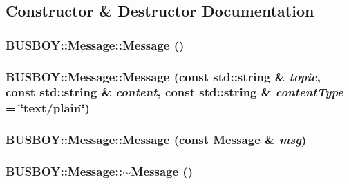 \subsection{Constructor \& Destructor Documentation}
\hypertarget{classBUSBOY_1_1Message_a3912e97d8f7dc2dcf2f2aaf2169cec41}{
\subsubsection[{Message}]{\setlength{\rightskip}{0pt plus 5cm}BUSBOY::Message::Message ()}}
\label{classBUSBOY_1_1Message_a3912e97d8f7dc2dcf2f2aaf2169cec41}
\hypertarget{classBUSBOY_1_1Message_a989563a7637c292afd0cf2442458c121}{
\subsubsection[{Message}]{\setlength{\rightskip}{0pt plus 5cm}BUSBOY::Message::Message (const std::string \& {\em topic}, \/  const std::string \& {\em content}, \/  const std::string \& {\em contentType} = {\ttfamily \char`\"{}text/plain\char`\"{}})}}
\label{classBUSBOY_1_1Message_a989563a7637c292afd0cf2442458c121}
\hypertarget{classBUSBOY_1_1Message_ac7b26859647f2bab027e1c6cee5f1864}{
\subsubsection[{Message}]{\setlength{\rightskip}{0pt plus 5cm}BUSBOY::Message::Message (const {\bf Message} \& {\em msg})}}
\label{classBUSBOY_1_1Message_ac7b26859647f2bab027e1c6cee5f1864}
\hypertarget{classBUSBOY_1_1Message_a2abcd82dbfb9d51bdd7bd3c9eac7ca43}{
\subsubsection[{$\sim$Message}]{\setlength{\rightskip}{0pt plus 5cm}BUSBOY::Message::$\sim$Message ()}}
\label{classBUSBOY_1_1Message_a2abcd82dbfb9d51bdd7bd3c9eac7ca43}


